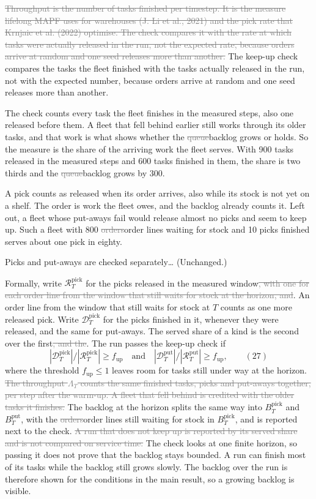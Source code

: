 \documentclass[11pt,a4paper]{article}
\newcommand{\new}[1]{\textcolor{newc}{#1}}
\newcommand{\old}[1]{\textcolor{gray}{\sout{#1}}}
\begin{document}
\old{Throughput is the number of tasks finished per timestep. It is the
measure lifelong MAPF uses for warehouses (J. Li et al., 2021) and the pick
rate that Krnjaic et al. (2022) optimise. The check compares it with the rate
at which tasks were actually released in the run, not the expected rate,
because orders arrive at random and one seed releases more than another.}
\new{The keep-up check compares the tasks the fleet finished with the tasks
actually released in the run, not with the expected number, because orders
arrive at random and one seed releases more than another.}

The check counts every task the fleet finishes in the measured steps, also
one released before them. A fleet that fell behind earlier still works
through its older tasks, and that work is what shows whether the
\old{queue}\new{backlog} grows or holds. So the measure is the share of the
arriving work the fleet serves. With 900 tasks released in the measured steps
and 600 tasks finished in them, the share is two thirds and the
\old{queue}\new{backlog} grows by 300.

A pick counts as released when its order arrives, also while its stock is not
yet on a shelf. The order is work the fleet owes, and the backlog already
counts it. Left out, a fleet whose put-aways fail would release almost no
picks and seem to keep up. Such a fleet with 800 \old{orders}\new{order
lines} waiting for stock and 10 picks finished serves about one pick in
eighty.

Picks and put-aways are checked separately\ldots{} (Unchanged.)

Formally, write $\mathcal{R}^{\mathrm{pick}}_T$ for the picks released in the
measured window\old{, with one for each order line from the window that still
waits for stock at the horizon, and}\new{. An order line from the window that
still waits for stock at $T$ counts as one more released pick. Write}
$\mathcal{D}^{\mathrm{pick}}_T$ for the picks finished in it, whenever they
were released, and the same for put-aways. The served share of a kind is the
second over the first\old{, and the}\new{. The} run passes the keep-up check
if
\[
  |\mathcal{D}^{\mathrm{pick}}_T| / |\mathcal{R}^{\mathrm{pick}}_T| \ge f_{\mathrm{up}}
  \quad\text{and}\quad
  |\mathcal{D}^{\mathrm{put}}_T| / |\mathcal{R}^{\mathrm{put}}_T| \ge f_{\mathrm{up}} , \qquad (27)
\]
where the threshold $f_{\mathrm{up}} \le 1$ leaves room for tasks still under
way at the horizon. \old{The throughput $\Lambda_T$ counts the same finished
tasks, picks and put-aways together, per step after the warm-up. A fleet that
fell behind is credited with the older tasks it finishes.} The backlog at
the horizon splits the same way into $B^{\mathrm{pick}}_T$ and
$B^{\mathrm{put}}_T$, with the \old{orders}\new{order lines} still waiting
for stock in $B^{\mathrm{pick}}_T$, and is reported next to the check.
\old{A run that does not keep up is reported by its served share and is not
compared on service time.} The check looks at one finite horizon, so passing
it does not prove that the backlog stays bounded. A run can finish most of
its tasks while the backlog still grows slowly. The backlog over the run is
therefore shown for the conditions in the main result, so a growing backlog
is visible.
\end{document}
